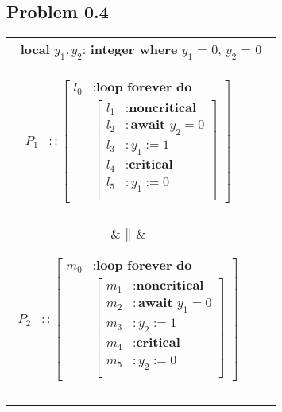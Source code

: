\documentclass[12pt]{article}
\begin{document}
\subsection*{Problem 0.4}
\begin{center}
\begin{tabular}{|ccc|}
\hline
\multicolumn{3}{|c|}{\textbf{local} $y_1,y_2$: \textbf{integer where} $y_1$ = 0, $y_2$ = 0} \\
\parbox{4cm}{\begin{align*}
      P_1 &:: \left[ \begin{aligned}
 		l_0 &: \textbf{loop forever do } \\ 
 			& \left[ \begin{aligned}
 				l_1 &: \textbf{noncritical}\\ 
 				l_2 &: \textbf{await } y_2 = 0\\
 				l_3 &: y_1 := 1\\
 				l_4 &: \textbf{critical}\\
 				l_5 &: y_1 := 0\\
			\end{aligned} \right]
		\end{aligned} \right]\\
   \end{align*}}
   &
	$\big{\|}$   
   &
   \parbox{4cm}{\begin{align*}
      P_2 &:: \left[ \begin{aligned}
 		m_0 &: \textbf{loop forever do } \\ 
 			& \left[ \begin{aligned}
 				m_1 &: \textbf{noncritical}\\ 
 				m_2 &: \textbf{await } y_1 = 0\\
 				m_3 &: y_2 := 1\\
 				m_4 &: \textbf{critical}\\
 				m_5 &: y_2 := 0\\
			\end{aligned} \right]
		\end{aligned} \right]\\
   \end{align*}}\\
    \\\hline
\end{tabular}
\end{center}
\end{document}
